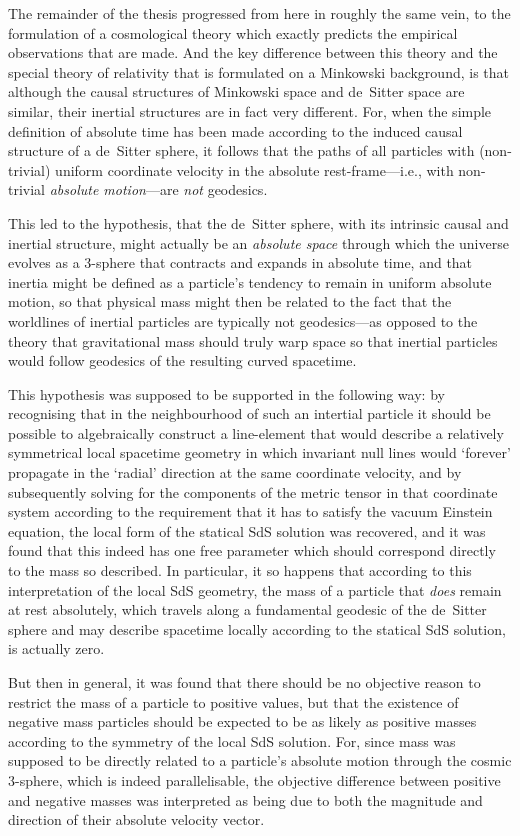 The remainder of the thesis progressed from here in roughly the same vein, to the formulation of a cosmological theory which exactly predicts the empirical observations that are made. And the key difference between this theory and the special theory of relativity that is formulated on a Minkowski background, is that although the causal structures of Minkowski space and de~Sitter space are similar, their inertial structures are in fact very different. For, when the simple definition of absolute time has been made according to the induced causal structure of a de~Sitter sphere, it follows that the paths of all particles with (non-trivial) uniform coordinate velocity in the absolute rest-frame---i.e., with non-trivial \textit{absolute motion}---are \textit{not} geodesics.

This led to the hypothesis, that the de~Sitter sphere, with its intrinsic causal and inertial structure, might actually be an \textit{absolute space} through which the universe evolves as a 3-sphere that contracts and expands in absolute time, and that inertia might be defined as a particle's tendency to remain in uniform absolute motion, so that physical mass might then be related to the fact that the worldlines of inertial particles are typically not geodesics---as opposed to the theory that gravitational mass should truly warp space so that inertial particles would follow geodesics of the resulting curved spacetime. 

This hypothesis was supposed to be supported in the following way: by recognising that in the neighbourhood of such an intertial particle it should be possible to algebraically construct a line-element that would describe a relatively symmetrical local spacetime geometry in which invariant null lines would `forever' propagate in the `radial' direction at the same coordinate velocity, and by subsequently solving for the components of the metric tensor in that coordinate system according to the requirement that it has to satisfy the vacuum Einstein equation, the local form of the statical SdS solution was recovered, and it was found that this indeed has one free parameter which should correspond directly to the mass so described. In particular, it so happens that according to this interpretation of the local SdS geometry, the mass of a particle that \textit{does} remain at rest absolutely, which travels along a fundamental geodesic of the de~Sitter sphere and may describe spacetime locally according to the statical SdS solution, is actually zero.

But then in general, it was found that there should be no objective reason to restrict the mass of a particle to positive values, but that the existence of negative mass particles should be expected to be as likely as positive masses according to the symmetry of the local SdS solution. For, since mass was supposed to be directly related to a particle's absolute motion through the cosmic 3-sphere, which is indeed parallelisable, the objective difference between positive and negative masses was interpreted as being due to both the magnitude and direction of their absolute velocity vector.

